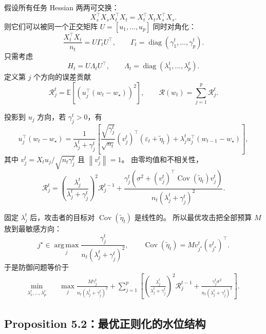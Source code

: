 \documentclass[UTF8,fontset=none,11pt]{ctexart}
\theoremstyle{cnstyle}
\newcommand{\E}{\mathbb{E}}
\newcommand{\Cov}{\operatorname{Cov}}
\newcommand{\diag}{\operatorname{diag}}
\newcommand{\argmax}{\operatorname*{arg\,max}}
\newcommand{\calR}{\mathcal{R}}
\newcommand{\norm}[1]{\left\lVert #1\right\rVert}
\begin{document}
假设所有任务 Hessian 两两可交换：
\[
  X_s^\top X_sX_t^\top X_t=X_t^\top X_tX_s^\top X_s .
\]
则它们可以被同一个正交矩阵 \(U=[u_1,\dots,u_p]\) 同时对角化：
\[
  \frac{X_t^\top X_t}{n_t}
  =
  U\Gamma_tU^\top,\qquad
  \Gamma_t=\diag(\gamma_1^t,\dots,\gamma_p^t).
\]
只需考虑
\[
  H_t=U\Lambda_tU^\top,\qquad
  \Lambda_t=\diag(\lambda_1^t,\dots,\lambda_p^t).
\]
定义第 \(j\) 个方向的误差贡献
\[
  \calR_j^t=\E[(u_j^\top(w_t-w_\star))^2],
  \qquad
  \calR(w_t)=\sum_{j=1}^p\calR_j^t.
\]

投影到 \(u_j\) 方向，若 \(\gamma_j^t>0\)，有
\begin{equation}
  u_j^\top(w_t-w_\star)
  =
  \frac{1}{\lambda_j^t+\gamma_j^t}
  \left[
  \frac{\sqrt{\gamma_j^t}}{\sqrt{n_t}}(v_j^t)^\top(\varepsilon_t+\tilde\eta_t)
  +\lambda_j^tu_j^\top(w_{t-1}-w_\star)
  \right],
  \label{eq:per-direction}
\end{equation}
其中 \(v_j^t=X_tu_j/\sqrt{n_t\gamma_j^t}\) 且 \(\norm{v_j^t}=1\)。
由零均值和不相关性，
\begin{equation}
  \calR_j^t
  =
  \left(\frac{\lambda_j^t}{\lambda_j^t+\gamma_j^t}\right)^2
  \calR_j^{t-1}
  +
  \frac{
  \gamma_j^t\left(\sigma^2+(v_j^t)^\top\Cov(\tilde\eta_t)v_j^t\right)
  }{
  n_t(\lambda_j^t+\gamma_j^t)^2
  } .
  \label{eq:risk-per-direction}
\end{equation}

固定 \(\lambda_j^t\) 后，攻击者的目标对 \(\Cov(\tilde\eta_t)\) 是线性的。
所以最优攻击把全部预算 \(M\) 放到最敏感方向：
\[
  j^\star\in
  \argmax_j
  \frac{\gamma_j^t}{n_t(\lambda_j^t+\gamma_j^t)^2},
  \qquad
  \Cov(\tilde\eta_t)=Mv_{j^\star}^t(v_{j^\star}^t)^\top .
\]
于是防御问题等价于
\begin{align}
  \min_{\lambda_1^t,\dots,\lambda_p^t}\quad
  &
  \max_j
  \frac{M\gamma_j^t}{n_t(\lambda_j^t+\gamma_j^t)^2}
  +
  \sum_{j=1}^p
  \left[
  \left(\frac{\lambda_j^t}{\lambda_j^t+\gamma_j^t}\right)^2
  \calR_j^{t-1}
  +
  \frac{\gamma_j^t\sigma^2}{n_t(\lambda_j^t+\gamma_j^t)^2}
  \right].
  \label{eq:scalar-minimax}
\end{align}

\subsection{Proposition 5.2：最优正则化的水位结构}
\end{document}
